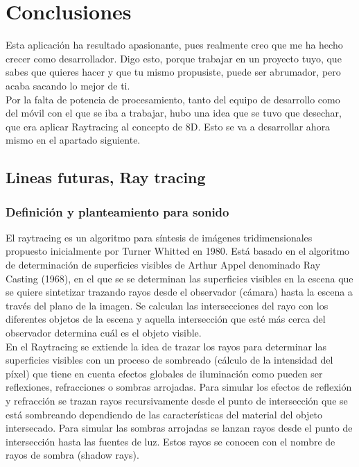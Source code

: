\section{Conclusiones}

\quad Esta aplicación ha resultado apasionante, pues realmente creo que me ha hecho crecer como desarrollador. Digo esto, porque trabajar en un proyecto tuyo, que sabes que quieres hacer y que tu mismo propusiste, puede ser abrumador, pero acaba sacando lo mejor de ti.\\

\quad Por la falta de potencia de procesamiento, tanto del equipo de desarrollo como del móvil con el que se iba a trabajar, hubo una idea que se tuvo que desechar, que era aplicar Raytracing al concepto de 8D. Esto se va a desarrollar ahora mismo en el apartado siguiente.\\

\subsection{Lineas futuras, Ray tracing}

\subsubsection{Definición y planteamiento para sonido}

\quad El raytracing es un algoritmo para síntesis de imágenes tridimensionales propuesto inicialmente por Turner Whitted en 1980. Está basado en el algoritmo de determinación de superficies visibles de Arthur Appel denominado Ray Casting (1968), en el que se se determinan las superficies visibles en la escena que se quiere sintetizar trazando rayos desde el observador (cámara) hasta la escena a través del plano de la imagen. Se calculan las intersecciones del rayo con los diferentes objetos de la escena y aquella intersección que esté más cerca del observador determina cuál es el objeto visible.\\

\quad En el Raytracing se extiende la idea de trazar los rayos para determinar las superficies visibles con un proceso de sombreado (cálculo de la intensidad del píxel) que tiene en cuenta efectos globales de iluminación como pueden ser reflexiones, refracciones o sombras arrojadas. Para simular los efectos de reflexión y refracción se trazan rayos recursivamente desde el punto de intersección que se está sombreando dependiendo de las características del material del objeto intersecado. Para simular las sombras arrojadas se lanzan rayos desde el punto de intersección hasta las fuentes de luz. Estos rayos se conocen con el nombre de rayos de sombra (shadow rays).\\

